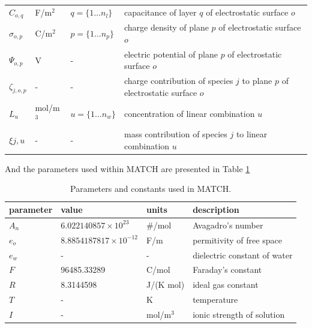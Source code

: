\documentclass{article}
\begin{document}
\begin{table}[H]
\begin{tabular}{l|l|l|l}
$C_{o,q}$       & F/m$^2$                   & $q = \{1 \ldots n_l\}$    & capacitance of layer $q$ of electrostatic surface $o$        \\
$\sigma_{o,p}$  & C/m$^2$                   & $p = \{1 \ldots n_p\}$    & charge density of plane $p$ of electrostatic surface $o$        \\
$\Psi_{o,p}$    & V                         & -                         & electric potential of plane $p$ of electrostatic surface $o$        \\
$\zeta_{j,o,p}$ & -                         & -                         & charge contribution of species $j$ to plane $p$ of electrostatic surface $o$ \\
$L_{u}$         & mol/m$^3$                 & $u = \{1 \ldots n_w\}$    & concentration of linear combination $u$ \\
$\xi{j,u}$      & -                         & -                         & mass contribution of species $j$ to linear combination $u$ \\
\bottomrule
\end{tabular}
\end{table}

And the parameters used within MATCH are presented in Table \ref{table:params}

\begin{table}[H]
\centering
\caption{Parameters and constants used in MATCH.}
\label{table:params}
\begin{tabular}{l|l|l|l}
parameter       & value                      & units                     & description                           \\ \toprule
$A_n$           & $6.022140857 \times 10^{23}$           & \#/mol                   & Avagadro's number                      \\
$e_o$           & $8.8854187817 \times 10^{-12}$        & F/m                      & permitivity of free space                      \\
$e_w$           & -                          & -                        & dielectric constant of water                      \\
$F$             & 96485.33289                          & C/mol                        & Faraday's constant                      \\
$R$             & 8.3144598                          & J/(K mol)                        & ideal gas constant                      \\
$T$             & -                          & K                       & temperature                      \\
$I$             & -                          & mol/m$^3$                       & ionic strength of solution                      \\
\bottomrule
\end{tabular}
\end{table}
\end{document}

